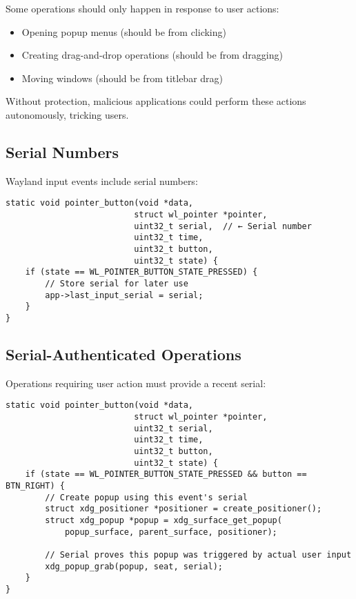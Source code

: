 Some operations should only happen in response to user actions:
\begin{itemize}
    \item Opening popup menus (should be from clicking)
    \item Creating drag-and-drop operations (should be from dragging)
    \item Moving windows (should be from titlebar drag)
\end{itemize}

Without protection, malicious applications could perform these actions autonomously, tricking users.

\subsection{Serial Numbers}

Wayland input events include serial numbers:

\begin{lstlisting}[style=cstyle, caption=Input Event Serials]
static void pointer_button(void *data,
                          struct wl_pointer *pointer,
                          uint32_t serial,  // ← Serial number
                          uint32_t time,
                          uint32_t button,
                          uint32_t state) {
    if (state == WL_POINTER_BUTTON_STATE_PRESSED) {
        // Store serial for later use
        app->last_input_serial = serial;
    }
}
\end{lstlisting}

\subsection{Serial-Authenticated Operations}

Operations requiring user action must provide a recent serial:

\begin{lstlisting}[style=cstyle, caption=Creating a Popup]
static void pointer_button(void *data,
                          struct wl_pointer *pointer,
                          uint32_t serial,
                          uint32_t time,
                          uint32_t button,
                          uint32_t state) {
    if (state == WL_POINTER_BUTTON_STATE_PRESSED && button == BTN_RIGHT) {
        // Create popup using this event's serial
        struct xdg_positioner *positioner = create_positioner();
        struct xdg_popup *popup = xdg_surface_get_popup(
            popup_surface, parent_surface, positioner);

        // Serial proves this popup was triggered by actual user input
        xdg_popup_grab(popup, seat, serial);
    }
}
\end{lstlisting}

